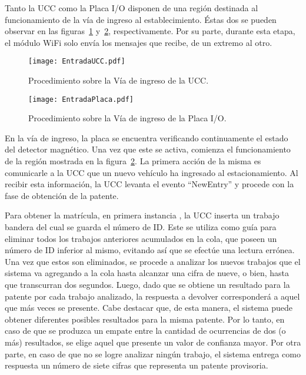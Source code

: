 Tanto la UCC como la Placa I/O disponen de una región destinada al funcionamiento de la vía de ingreso al establecimiento.  Éstas dos se pueden observar en las figuras~\ref{fig:img_EntradaUCC} y~\ref{fig:img_EntradaPlaca}, respectivamente. Por su parte, durante esta etapa, el módulo WiFi solo envía los mensajes que recibe, de un extremo al otro.

\begin{figure}[H]
	\centering
	\texttt{[image: EntradaUCC.pdf]}
	\caption{Procedimiento sobre la Vía de ingreso de la UCC.}
	\label{fig:img_EntradaUCC}
\end{figure}

\begin{figure}[H]
	\centering
	\texttt{[image: EntradaPlaca.pdf]}
	\caption{Procedimiento sobre la Vía de ingreso de la Placa I/O.}
	\label{fig:img_EntradaPlaca}
\end{figure}


En la vía de ingreso, la placa se encuentra verificando continuamente el estado del detector magnético. Una vez que este se activa, comienza el funcionamiento de la región mostrada en la figura~\ref{fig:img_EntradaPlaca}. La primera acción de la misma es comunicarle a la UCC que un nuevo vehículo ha ingresado al estacionamiento. Al recibir esta información, la UCC levanta el evento ``NewEntry'' y procede con la fase de obtención de la patente.

Para obtener la matrícula, en primera instancia , la UCC inserta un trabajo bandera del cual se guarda el número de ID. Este se utiliza como guía para eliminar todos los trabajos anteriores acumulados en la cola, que poseen un número de ID inferior al mismo, evitando así que se efectúe una lectura errónea. Una vez que estos son eliminados, se procede a analizar los nuevos trabajos que el sistema va agregando a la cola hasta alcanzar una cifra de nueve, o bien, hasta que transcurran dos segundos. Luego, dado que se obtiene un resultado para la patente por cada trabajo analizado, la respuesta a devolver corresponderá a aquel que más veces se presente. Cabe destacar que, de esta manera, el sistema puede obtener diferentes posibles resultados para la misma patente. Por lo tanto, en caso de que se produzca un empate entre la cantidad de ocurrencias de dos (o más) resultados, se elige aquel que presente un valor de confianza mayor. Por otra parte, en caso de que no se logre analizar ningún trabajo, el sistema entrega como respuesta un número de siete cifras que representa un patente provisoria.

